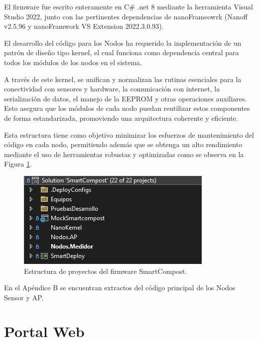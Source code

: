 El firmware \citep{codigoFuente} fue escrito enteramente en C\# .net 8 mediante la herramienta Visual Studio 2022, junto con las pertinentes dependencias de nanoFrameowrk (Nanoff v2.5.96 y nanoFramwork VS Extension 2022.3.0.93).

El desarrollo del código para los Nodos ha requerido la implementación de un patrón de diseño tipo kernel, el cual funciona como dependencia central para todos los módulos de los nodos en el sistema.

A través de este kernel, se unifican y normalizan las rutinas esenciales para la conectividad con sensores y hardware, la comunicación con internet, la serialización de datos, el manejo de la EEPROM y otras operaciones auxiliares. Esto asegura que los módulos de cada nodo puedan reutilizar estos componentes de forma estandarizada, promoviendo una arquitectura coherente y eficiente.

Esta estructura tiene como objetivo minimizar los esfuerzos de mantenimiento del código en cada nodo, permitiendo además que se obtenga un alto rendimiento mediante el uso de herramientas robustas y optimizadas como se observa en la Figura \ref{fig:estructura-codigo-firmware}.

\begin{figure}[H]
    \centering
    \includegraphics[width=0.8\linewidth]{Figures//Firmware/smartcompost_app.png}
    \caption{Estructura de proyectos del firmware SmartCompost.}
    \label{fig:estructura-codigo-firmware}
\end{figure}

En el Apéndice B se encuentran extractos del código principal de los Nodos Sensor y AP.

\section{Portal Web}


